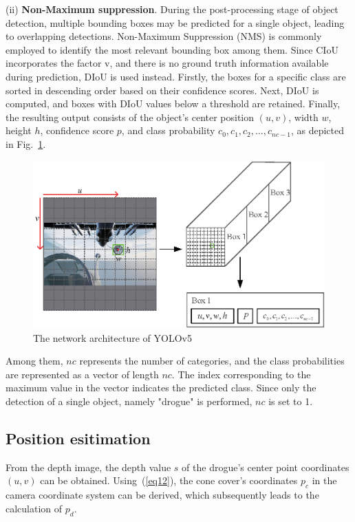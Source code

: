 (ii) \textbf{Non-Maximum suppression}. During the post-processing stage of object detection, multiple bounding boxes may be predicted for a single object, leading to overlapping detections. Non-Maximum Suppression (NMS) is commonly employed to identify the most relevant bounding box among them. Since CIoU incorporates the factor v, and there is no ground truth information available during prediction, DIoU is used instead. Firstly, the boxes for a specific class are sorted in descending order based on their confidence scores. Next, DIoU is computed, and boxes with DIoU values below a threshold are retained. Finally, the resulting output consists of the object's center position $(u,v )$, width $w$, height $h$, confidence score $p$, and class probability $c_0,c_1,c_2,\dots,c_{nc-1}$, as depicted in Fig.~\ref{YOLO-output}.

\begin{figure}[!htb]
	\centering
	\includegraphics[width=13cm]{Figures/Figs_Ch6/YOLO-output.eps}
	\caption{The network architecture of YOLOv5}
	\label{YOLO-output}
\end{figure}

Among them, $nc$ represents the number of categories, and the class probabilities are represented as a vector of length $nc$. The index corresponding to the maximum value in the vector indicates the predicted class. Since only the detection of a single object, namely "drogue" is performed, $nc$ is set to 1.

\subsection{Position esitimation}
From the depth image, the depth value $s$ of the drogue's center point coordinates $(u, v)$ can be obtained. Using~(\ref{eq12}), the cone cover's coordinates $p_c$ in the camera coordinate system can be derived, which subsequently leads to the calculation of $p_d$.

